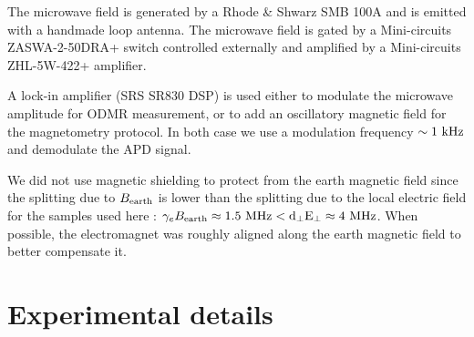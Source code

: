 \documentclass[preprintnumbers,amsmath,amssymb,onecolumn,12pt]{revtex4-2}\usepackage{graphicx}%
\begin{document}
The microwave field is generated by a Rhode \& Shwarz SMB 100A and is emitted with a handmade loop antenna. The microwave field is gated by a Mini-circuits ZASWA-2-50DRA+ switch controlled externally and amplified by a Mini-circuits ZHL-5W-422+ amplifier.

A lock-in amplifier (SRS SR830 DSP) is used either to modulate the microwave amplitude for ODMR measurement, or to add an oscillatory magnetic field for the magnetometry protocol. In both case we use a modulation frequency $\sim 1\ \rm kHz$ and demodulate the APD signal.

We did not use magnetic shielding to protect from the earth magnetic field since the splitting due to  $B_{\rm earth}$ is lower than the splitting due to the local electric field for the samples used here : $ \gamma_e B_{\rm earth} \approx 1.5\ \rm MHz < d_\perp E_\perp \approx 4\ \rm MHz$. 
When possible, the electromagnet was roughly aligned along the earth magnetic field to better compensate it.
\section{Experimental details}
\end{document}
